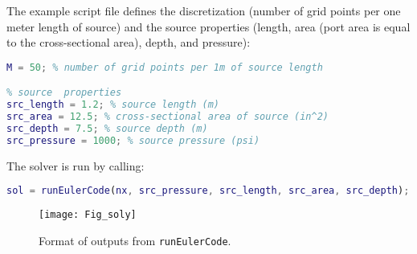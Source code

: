 \documentclass[10pt]{article}
\begin{document}
The example script file defines the discretization (number of grid points per one meter length of source) and the source properties (length, area (port area is equal to the cross-sectional area), depth, and pressure):
\begin{lstlisting}[language=Matlab]
% define discretization
M = 50; % number of grid points per 1m of source length

% source  properties
src_length = 1.2; % source length (m)
src_area = 12.5; % cross-sectional area of source (in^2)
src_depth = 7.5; % source depth (m)
src_pressure = 1000; % source pressure (psi)
\end{lstlisting}

The solver is run by calling:
\begin{lstlisting}[language=Matlab]
sol = runEulerCode(nx, src_pressure, src_length, src_area, src_depth);
\end{lstlisting}

\begin{figure}[b!]
\centering
\texttt{[image: Fig\_soly]}
\caption{Format of outputs from \texttt{runEulerCode}.}
\label{fig:sol y}
\end{figure}

\end{document}
